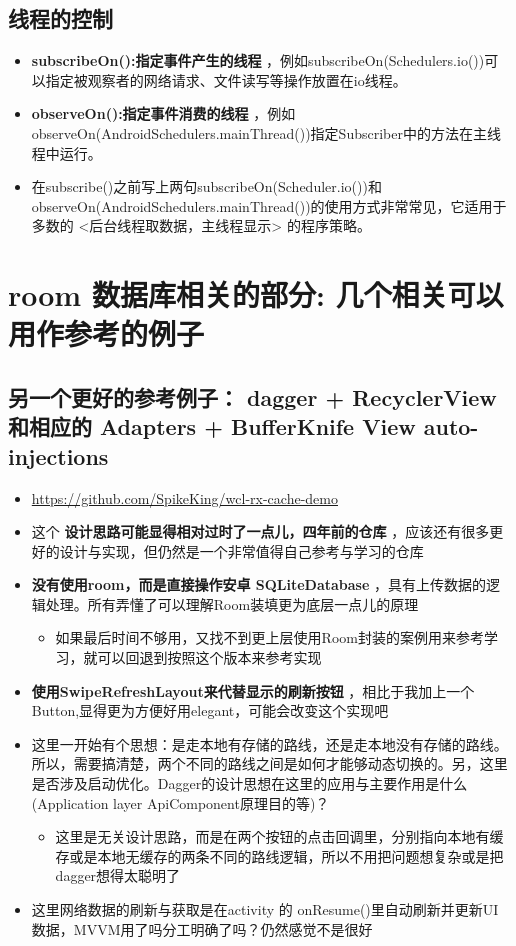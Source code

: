 \documentclass[9pt, b5paper]{article}
\begin{document}
\subsection{线程的控制}
\label{sec-6-2}
\begin{itemize}
\item \textbf{subscribeOn():指定事件产生的线程} ，例如subscribeOn(Schedulers.io())可以指定被观察者的网络请求、文件读写等操作放置在io线程。
\item \textbf{observeOn():指定事件消费的线程} ，例如observeOn(AndroidSchedulers.mainThread())指定Subscriber中的方法在主线程中运行。
\item 在subscribe()之前写上两句subscribeOn(Scheduler.io())和observeOn(AndroidSchedulers.mainThread())的使用方式非常常见，它适用于多数的 <后台线程取数据，主线程显示> 的程序策略。
\end{itemize}
\section{room 数据库相关的部分: 几个相关可以用作参考的例子}
\label{sec-7}
\subsection{另一个更好的参考例子： dagger + RecyclerView 和相应的 Adapters + BufferKnife View auto-injections}
\label{sec-7-1}
\begin{itemize}
\item \url{https://github.com/SpikeKing/wcl-rx-cache-demo}
\item 这个 \textbf{设计思路可能显得相对过时了一点儿，四年前的仓库} ，应该还有很多更好的设计与实现，但仍然是一个非常值得自己参考与学习的仓库
\item \textbf{没有使用room，而是直接操作安卓 SQLiteDatabase} ，具有上传数据的逻辑处理。所有弄懂了可以理解Room装填更为底层一点儿的原理
\begin{itemize}
\item 如果最后时间不够用，又找不到更上层使用Room封装的案例用来参考学习，就可以回退到按照这个版本来参考实现
\end{itemize}
\item \textbf{使用SwipeRefreshLayout来代替显示的刷新按钮} ，相比于我加上一个Button,显得更为方便好用elegant，可能会改变这个实现吧
\item 这里一开始有个思想：是走本地有存储的路线，还是走本地没有存储的路线。所以，需要搞清楚，两个不同的路线之间是如何才能够动态切换的。另，这里是否涉及启动优化。Dagger的设计思想在这里的应用与主要作用是什么(Application layer ApiComponent原理目的等)？
\begin{itemize}
\item 这里是无关设计思路，而是在两个按钮的点击回调里，分别指向本地有缓存或是本地无缓存的两条不同的路线逻辑，所以不用把问题想复杂或是把dagger想得太聪明了
\end{itemize}
\item 这里网络数据的刷新与获取是在activity 的 onResume()里自动刷新并更新UI数据，MVVM用了吗分工明确了吗？仍然感觉不是很好
\end{itemize}
\end{document}
